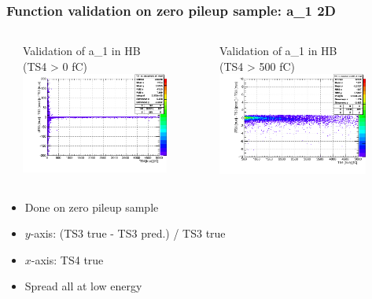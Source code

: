 \documentclass[bigger]{beamer}
\begin{document}
\begin{frame}
\frametitle{Function validation on zero pileup sample: a\_1 2D}
\label{sec-3-2-3}
\begin{columns} %
\label{sec-3-2-3-1}
\begin{column}{0.55\textwidth}
\label{sec-3-2-3-1-1}

\centering
Validation of a\_1 in HB \\ (TS4 > 0 fC)
\includegraphics[width=0.8\textwidth]{fig/crosscheck_a0_0.png}
\end{column}
\begin{column}{0.55\textwidth}
\label{sec-3-2-3-1-2}

\centering
Validation of a\_1 in HB \\ (TS4 > 500 fC)
\includegraphics[width=0.8\textwidth]{fig/crosscheck_over500_a0_0.png}
\end{column}
\end{columns}
\label{sec-3-2-3-2}
\begin{itemize}

\item Done on zero pileup sample
\label{sec-3-2-3-2-1}%

\item $y$-axis: (TS3 true - TS3 pred.) / TS3 true
\label{sec-3-2-3-2-2}%

\item $x$-axis: TS4 true
\label{sec-3-2-3-2-3}%

\item Spread all at low energy
\label{sec-3-2-3-2-4}%
\end{itemize} %
\end{frame}
\end{document}
